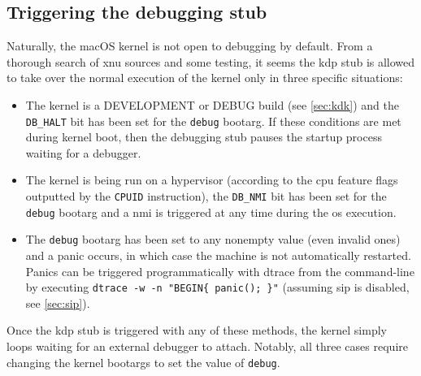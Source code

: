 \subsection{Triggering the debugging stub}\label{sec:kdptriggers}
Naturally, the macOS kernel is not open to debugging by default. From a thorough search of \gls{xnu} sources and some testing, it seems the \gls{kdp} stub is allowed to take over the normal execution of the kernel only in three specific situations:
\begin{itemize}
    \item The kernel is a DEVELOPMENT or DEBUG build (see \cref{sec:kdk}) and the \lstinline{DB_HALT} bit has been set for the \lstinline{debug} \gls{bootarg}. If these conditions are met during kernel boot, then the debugging stub pauses the startup process waiting for a debugger.
    

    \item The kernel is being run on a hypervisor (according to the \gls{cpu} feature flags outputted by the \lstinline{CPUID} instruction), the \lstinline{DB_NMI} bit has been set for the \lstinline{debug} \gls{bootarg} and a \gls{nmi} is triggered at any time during the \gls{os} execution.
    

    \item The \lstinline{debug} \gls{bootarg} has been set to any nonempty value (even invalid ones) and a panic occurs, in which case the machine is not automatically restarted. Panics can be triggered programmatically with \gls{dtrace} from the command-line by executing \lstinline|dtrace -w -n "BEGIN{ panic(); }"| (assuming \gls{sip} is disabled, see \cref{sec:sip}).
\end{itemize}
Once the \gls{kdp} stub is triggered with any of these methods, the kernel simply loops waiting for an external debugger to attach. Notably, all three cases require changing the kernel \glspl{bootarg} to set the value of \lstinline{debug}.


